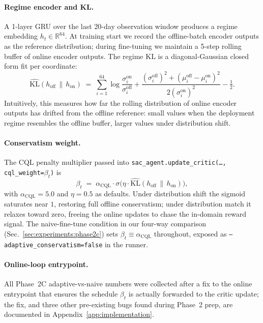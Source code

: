 \paragraph{Regime encoder and KL.} A 1-layer GRU over the last 20-day
observation window produces a regime embedding $h_t \in \mathbb{R}^{64}$.
At training start we record the offline-batch encoder outputs as the
reference distribution; during fine-tuning we maintain a 5-step rolling
buffer of online encoder outputs. The regime KL is a diagonal-Gaussian
closed form fit per coordinate:
\begin{equation}
\widehat{\mathrm{KL}}(h_{\text{off}} \,\|\, h_{\text{on}}) \;=\;
\sum_{i=1}^{64} \log\!\frac{\sigma^{\text{on}}_i}{\sigma^{\text{off}}_i}
+ \frac{(\sigma^{\text{off}}_i)^2 + (\mu^{\text{off}}_i - \mu^{\text{on}}_i)^2}{2 (\sigma^{\text{on}}_i)^2}
- \tfrac{1}{2}.
\end{equation}
Intuitively, this measures how far the rolling distribution of online
encoder outputs has drifted from the offline reference: small values
when the deployment regime resembles the offline buffer, larger values
under distribution shift.

\paragraph{Conservatism weight.} The CQL penalty multiplier passed into
\texttt{sac\_agent.update\_critic(\dots, cql\_weight=$\beta_t$)} is
\begin{equation}
\label{eq:cql-schedule}
\beta_t \;=\; \alpha_{\mathrm{CQL}} \cdot \sigma\!\big(\eta \cdot \widehat{\mathrm{KL}}(h_{\text{off}} \,\|\, h_{\text{on}})\big),
\end{equation}
with $\alpha_{\mathrm{CQL}} = 5.0$ and $\eta = 0.5$ as defaults. Under
distribution shift the sigmoid saturates near $1$, restoring full offline
conservatism; under distribution match it relaxes toward zero, freeing the
online updates to chase the in-domain reward signal. The naive-fine-tune
condition in our four-way comparison (Sec.~\ref{sec:experiments:phase2c})
sets $\beta_t \equiv \alpha_{\mathrm{CQL}}$ throughout, exposed as
\texttt{--adaptive\_conservatism=false} in the runner.

\paragraph{Online-loop entrypoint.} All Phase~2C adaptive-vs-naive
numbers were collected after a fix to the online entrypoint that
ensures the schedule $\beta_t$ is actually forwarded to the critic
update; the fix, and three other pre-existing bugs found during Phase~2
prep, are documented in Appendix~\ref{app:implementation}.

